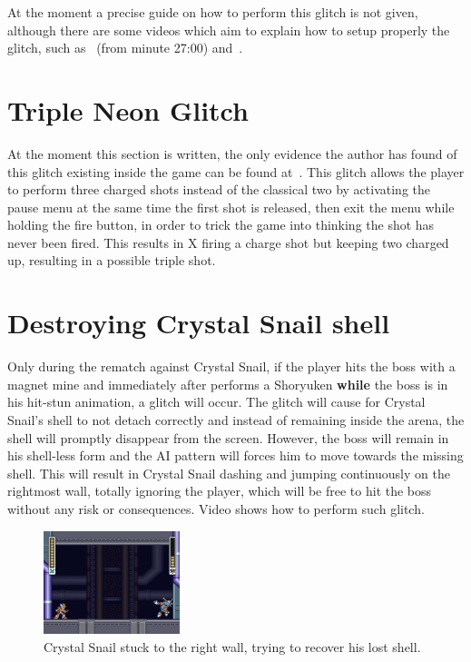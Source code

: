 At the moment a precise guide on how to perform this glitch is not given, although there are some videos which aim to explain how to setup properly the glitch, such as~\cite{video:tail_spin_1} (from minute 27:00) and~\cite{video:tail_spin_2}.

\section{Triple Neon Glitch}
At the moment this section is written, the only evidence the author has found of this glitch existing inside the game can be found at~\cite{video:triple_glitch}. This glitch allows the player to perform three charged shots instead of the classical two by activating the pause menu at the same time the first shot is released, then exit the menu while holding the fire button, in order to trick the game into thinking the shot has never been fired. This results in X firing a charge shot but keeping two charged up, resulting in a possible triple shot.


\section{Destroying Crystal Snail shell}
Only during the rematch against Crystal Snail, if the player hits the boss with a magnet mine and immediately after performs a Shoryuken \textbf{while} the boss is in his hit-stun animation, a glitch will occur. The glitch will cause for Crystal Snail's shell to not detach correctly and  instead of remaining inside the arena, the shell will promptly disappear from the screen. However, the boss will remain in his shell-less form and the AI pattern will forces him to move towards the missing shell. This will result in Crystal Snail dashing and jumping continuously on the rightmost wall, totally ignoring the player, which will be free to hit the boss without any risk or consequences. Video  shows how to perform such glitch.
\begin{figure}[htp]
	\centering
	\includegraphics[height=3cm]{figures/X2/Crystal_snail/snail_shell_glitch.png}
	\caption{Crystal Snail stuck to the right wall, trying to recover his lost shell.}
\end{figure}

